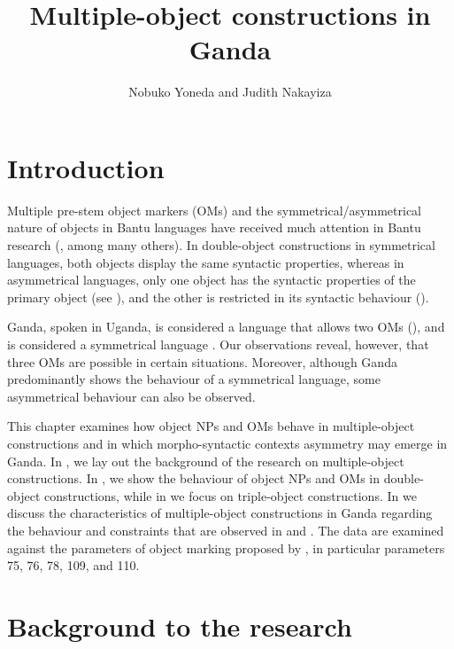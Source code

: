 \documentclass[output=paper,
            colorlinks, citecolor=brown
            ,draftmode
		  ]{langscibook}
\author{Nobuko Yoneda\orcid{}\affiliation{} and Judith Nakayiza\orcid{}\affiliation{}}
\title{Multiple-object constructions in Ganda}
\begin{document}
\maketitle 
{}



\section{Introduction}\label{sec:yoneda:1}


Multiple pre-stem object markers (OMs) and the symmetrical/asymmetrical nature of objects in Bantu languages have received much attention in Bantu research (\citealt{BresnanMoshi1993, Marlo2015, MartenKula2012, Zeller2014}, among many others). In double-object constructions in symmetrical languages, both objects display the same syntactic properties, whereas in asymmetrical languages, only one object has the syntactic properties of the primary object (see ), and the other is restricted in its syntactic behaviour (\citealt{BresnanMoshi1993}). 

    Ganda, spoken in Uganda, is considered a language that allows two OMs (\citealt{Ssekiryango2006, Marlo2015, Ranero2019, vanderWal2020}), and is considered a symmetrical language \citep{Ssekiryango2006}. Our observations reveal, however, that three OMs are possible in certain situations. Moreover, although Ganda predominantly shows the behaviour of a symmetrical language, some asymmetrical behaviour can also be observed. 

    This chapter examines how object NPs and OMs behave in multiple-object constructions and in which morpho-syntactic contexts asymmetry may emerge in Ganda. In , we lay out the background of the research on multiple-object constructions. In , we show the behaviour of object NPs and OMs in double-object constructions, while in  we focus on triple-object constructions. In  we discuss the characteristics of multiple-object constructions in Ganda regarding the behaviour and constraints that are observed in   and . The data are examined against the parameters of object marking proposed by \citet{GuéroisEtAl2017}, in particular parameters 75, 76, 78, 109, and 110.


\section{Background to the research}\label{sec:yoneda:2}
\end{document}

